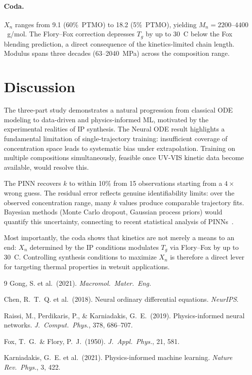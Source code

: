 \documentclass[10pt,twocolumn]{article}
\begin{document}
\paragraph{Coda.}
$X_n$ ranges from 9.1 (60\%~PTMO) to 18.2 (5\%~PTMO), yielding
$M_n = 2200$--$4400$~g/mol. The Flory--Fox correction depresses $T_g$ by
up to 30~\textdegree C below the Fox blending prediction, a direct consequence
of the kinetics-limited chain length. Modulus spans three decades
(63--2040~MPa) across the composition range.

\section*{Discussion}

The three-part study demonstrates a natural progression from classical ODE
modeling to data-driven and physics-informed ML, motivated by the experimental
realities of IP synthesis. The Neural ODE result highlights a fundamental
limitation of single-trajectory training: insufficient coverage of concentration
space leads to systematic bias under extrapolation. Training on multiple
compositions simultaneously, feasible once UV-VIS kinetic data become
available, would resolve this.

The PINN recovers $k$ to within 10\% from 15 observations starting from a
$4\times$ wrong guess. The residual error reflects genuine identifiability
limits: over the observed concentration range, many $k$ values produce
comparable trajectory fits. Bayesian methods (Monte Carlo dropout, Gaussian
process priors) would quantify this uncertainty, connecting to recent
statistical analysis of PINNs~\cite{karniadakis2021}.

Most importantly, the coda shows that kinetics are not merely a means to an
end: $X_n$ determined by the IP conditions modulates $T_g$ via Flory--Fox by
up to 30~\textdegree C. Controlling synthesis conditions to maximize $X_n$ is
therefore a direct lever for targeting thermal properties in wetsuit applications.

\begin{thebibliography}{9}
Gong, S. et al.\ (2021). \textit{Macromol.\ Mater.\ Eng.}

Chen, R.~T.~Q. et al.\ (2018).
Neural ordinary differential equations.
\textit{NeurIPS}.

Raissi, M., Perdikaris, P., \& Karniadakis, G.~E.\ (2019).
Physics-informed neural networks.
\textit{J.~Comput.~Phys.}, 378, 686--707.

Fox, T.~G.\ \& Flory, P.~J.\ (1950).
\textit{J.~Appl.~Phys.}, 21, 581.

Karniadakis, G.~E. et al.\ (2021).
Physics-informed machine learning.
\textit{Nature Rev.\ Phys.}, 3, 422.
\end{thebibliography}
\end{document}
